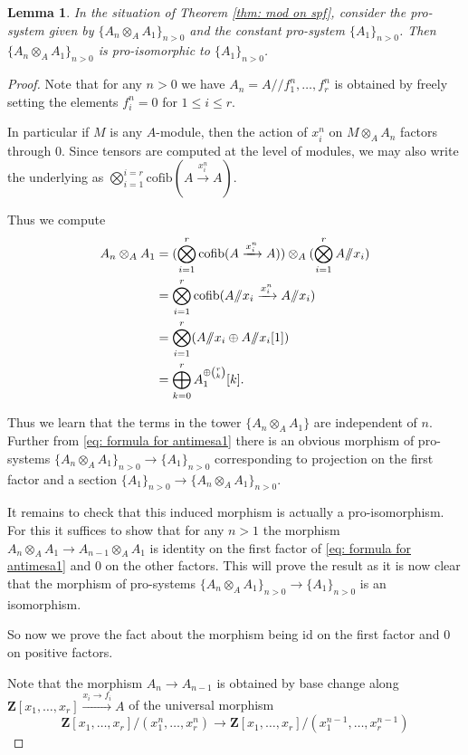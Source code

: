 \documentclass[10pt,a4paper]{amsart}
\newtheorem{lemma}{Lemma}
\newcommand{\ZZ}{\mathbf{Z}}
\newcommand{\cofib}{\mathrm{cofib}}
\newcommand{\id}{\mathrm{id}}
\newcommand{\qq}{/\!\!/}
\begin{document}
\begin{lemma}\label{lem: pro koszul}
    In the situation of Theorem \ref{thm: mod on spf}, consider the pro-system given by $\{A_{n}\otimes_A A_1\}_{n>0}$ and the constant pro-system $\{A_1\}_{n>0}$. Then $\{A_{n}\otimes_A A_1\}_{n>0}$ is pro-isomorphic to $\{A_1\}_{n>0}$.
\end{lemma}

\begin{proof}
Note that for any $n>0$ we have $A_n=A\qq f_1^n,\ldots, f^n_r$ is obtained by freely setting the elements $f^n_i=0$ for $ 1\leq i\leq r$. 


In particular if $M$ is any $A$-module, then the action of $x_i^n$ on $M\otimes_A A_n$ factors through $0.$
Since tensors are computed at the level of modules, we may also write the underlying as $\bigotimes_{i=1}^{i=r}\cofib(A\xrightarrow{x_i^n} A).$

Thus we compute 
\begin{align}\label{eq: formula for antimesa1}
A_n\otimes_A A_1
  &= (\bigotimes_{i=1}^{r}\cofib(A\xrightarrow{x_i^n} A))\otimes_A (\bigotimes_{i=1}^{r} A\qq x_i)\notag\\
  &= \bigotimes_{i=1}^{r}\cofib(A\qq x_i\xrightarrow{x_i^n} A\qq x_i)\notag\\
  &= \bigotimes_{i=1}^{r}(A\qq x_i\oplus A \qq x_i[1])\notag\\
  &= \bigoplus_{k=0}^{r} A_1^{\oplus \binom{r}{k} }[k].
\end{align}


Thus we learn that the terms in the tower $\{A_n\otimes_A A_1\}$ are independent of $n.$
Further from \ref{eq: formula for antimesa1} there is an obvious morphism of pro-systems $\{A_n\otimes_A A_1\}_{n>0}\to \{A_1\}_{n>0}$ corresponding to projection on the first factor and a section  $\{A_1\}_{n>0}\to \{A_n\otimes_A A_1\}_{n>0}.$ 

It remains to check that this induced morphism is actually a pro-isomorphism. For this it suffices to show that for any $n>1$ the morphism $A_n\otimes_A A_1\to A_{n-1}\otimes_A A_1$ is identity on the first factor of \ref{eq: formula for antimesa1} and $0$ on the other factors. This will prove the result as it is now clear that the morphism of pro-systems $\{A_n\otimes_A A_1\}_{n>0}\to \{A_1\}_{n>0}$ is an isomorphism. 

So now we prove the fact about the morphism being $\id$ on the first factor and $0$ on positive factors.

Note that the morphism $A_n\to A_{n-1}$ is obtained by base change along $\ZZ[x_1,\ldots, x_r]\xrightarrow{x_i\to f_i} A$ of the universal morphism 
\begin{equation}\label{eq: universal quotients}
  \ZZ[x_1,\ldots, x_r]/(x_1^n,\ldots, x_r^n)\to \ZZ[x_1,\ldots, x_r]/(x_1^{n-1},\ldots, x_r^{n-1})  
\end{equation}



\end{proof}
\end{document}
